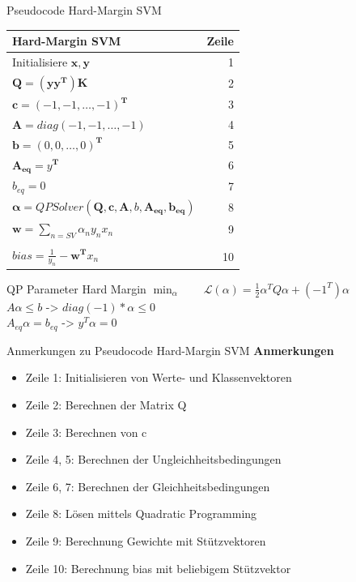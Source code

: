 \documentclass[ngerman]{beamer}
\newcommand{\Lagr}{\mathcal{L}}
\begin{document}
\begin{frame}{Pseudocode Hard-Margin SVM}
    \centering
    \begin{tabular}{l r}
        \textbf{Hard-Margin SVM} & \textbf{Zeile} \\
        \hline
        Initialisiere $\mathbf{x}, \mathbf{y}$ & 1\\ \pause
        $\mathbf{Q} = (\mathbf{y}\mathbf{y}^{\mathbf{T}})\mathbf{K}$ & 2\\ \pause
        $\mathbf{c} = \left( -1, -1, \ldots, -1 \right)^{\mathbf{T}}$ & 3 \\ \pause
        $\mathbf{A} = diag\left( -1, -1, \ldots, -1 \right)$ & 4 \\
        $\mathbf{b} = \left( 0, 0, \ldots, 0 \right)^{\mathbf{T}}$ & 5\\ \pause
        $\mathbf{A_{eq}} = y^{\mathbf{T}}$ & 6\\
        $b_{eq} = 0$ & 7\\ \pause
        $\mathbf{\alpha} = QPSolver\left( \mathbf{Q}, \mathbf{c}, \mathbf{A}, b, \mathbf{A_{eq}}, \mathbf{b_{eq}} \right)$ & 8\\ \pause
        $\mathbf{w} = \sum\limits_{n=SV} \alpha_{n} y_{n} x_{n}$  & 9\\ \pause
        & \\[-1em]
        $bias = \frac{1}{y_{n}} - \mathbf{w}^{\mathbf{T}}x_{n}$ & 10\\
    \end{tabular}
\end{frame}

\begin{frame}{QP Parameter Hard Margin}
    \centering
    $\!\min_{\alpha} \qquad \Lagr(\alpha) = \frac{1}{2} \alpha^{T} Q \alpha + (-1^T) \alpha$ \\ \pause
    $A \alpha \leq b$ -> $diag(-1) * \alpha \leq 0$ \\ \pause
    $A_{e q} \alpha = b_{e q}$ -> $y^{T} \alpha = 0$
\end{frame}

\begin{frame}{Anmerkungen zu Pseudocode Hard-Margin SVM}
    \textbf{Anmerkungen} \\
    \begin{itemize}
        \item Zeile 1: Initialisieren von Werte- und Klassenvektoren
        \item Zeile 2: Berechnen der Matrix Q
        \item Zeile 3: Berechnen von c
        \item Zeile 4, 5: Berechnen der Ungleichheitsbedingungen
        \item Zeile 6, 7: Berechnen der Gleichheitsbedingungen
        \item Zeile 8: Lösen mittels Quadratic Programming
        \item Zeile 9: Berechnung Gewichte mit Stützvektoren
        \item Zeile 10: Berechnung bias mit beliebigem Stützvektor
    \end{itemize}
\end{frame}
\end{document}
